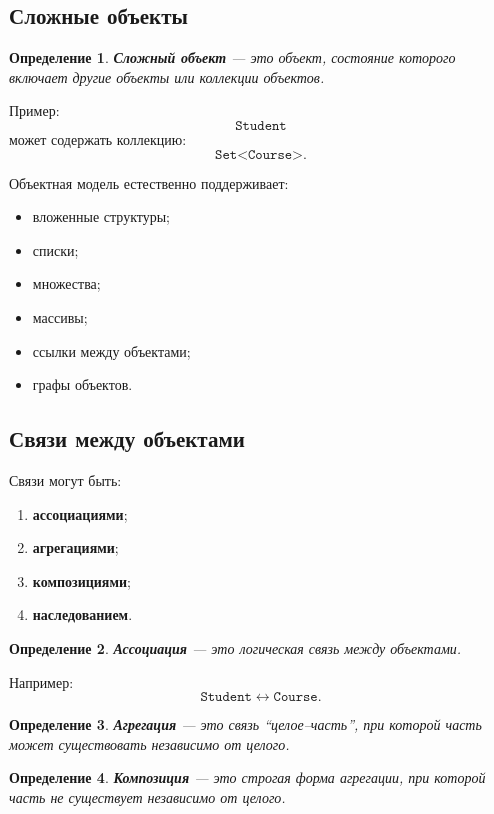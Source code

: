 \documentclass[12pt,a4paper]{article}
\newtheorem{definition}{Определение}[section]
\theoremstyle{remark}
\begin{document}
\subsection{Сложные объекты}

\begin{definition}
\textbf{Сложный объект} --- это объект, состояние которого включает другие объекты или коллекции объектов.
\end{definition}

Пример:
\[
\texttt{Student}
\]
может содержать коллекцию:
\[
\texttt{Set<Course>}.
\]

Объектная модель естественно поддерживает:
\begin{itemize}
    \item вложенные структуры;
    \item списки;
    \item множества;
    \item массивы;
    \item ссылки между объектами;
    \item графы объектов.
\end{itemize}

\subsection{Связи между объектами}

Связи могут быть:
\begin{enumerate}
    \item \textbf{ассоциациями};
    \item \textbf{агрегациями};
    \item \textbf{композициями};
    \item \textbf{наследованием}.
\end{enumerate}

\begin{definition}
\textbf{Ассоциация} --- это логическая связь между объектами.
\end{definition}

Например:
\[
\texttt{Student} \leftrightarrow \texttt{Course}.
\]

\begin{definition}
\textbf{Агрегация} --- это связь ``целое--часть'', при которой часть может существовать независимо от целого.
\end{definition}

\begin{definition}
\textbf{Композиция} --- это строгая форма агрегации, при которой часть не существует независимо от целого.
\end{definition}
\end{document}
